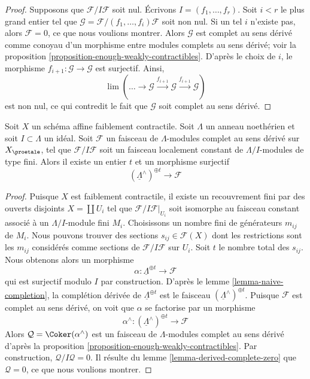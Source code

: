 \begin{proof}
Supposons que $\mathcal{F}/I\mathcal{F}$ soit nul.
Écrivons $I = (f_1, \ldots, f_r)$. Soit $i < r$ le plus grand
entier tel que $\mathcal{G} = \mathcal{F}/(f_1, \ldots, f_i)\mathcal{F}$
soit non nul. Si un tel $i$ n'existe pas, alors $\mathcal{F} = 0$, ce que nous
voulions montrer. Alors $\mathcal{G}$ est complet au sens dérivé comme conoyau
d'un morphisme entre modules complets au sens dérivé; voir la
proposition \ref{proposition-enough-weakly-contractibles}.
D'après le choix de $i$, le morphisme $f_{i + 1} : \mathcal{G} \to \mathcal{G}$
est surjectif. Ainsi,
$$
\lim (\ldots \to \mathcal{G} \xrightarrow{f_{i + 1}} \mathcal{G}
\xrightarrow{f_{i + 1}} \mathcal{G})
$$
est non nul, ce qui contredit le fait que $\mathcal{G}$ soit complet au sens dérivé.
\end{proof}

\begin{lemma}
\label{lemma-derived-complete-limit}
Soit $X$ un schéma affine faiblement contractile.
Soit $\Lambda$ un anneau noethérien et soit $I \subset \Lambda$ un idéal.
Soit $\mathcal{F}$ un faisceau de $\Lambda$-modules complet au sens dérivé
sur $X_\proetale$, tel que $\mathcal{F}/I\mathcal{F}$ soit un faisceau localement
constant de $\Lambda/I$-modules de type fini.
Alors il existe un entier $t$ et un morphisme surjectif
$$
(\underline{\Lambda}^\wedge)^{\oplus t} \to \mathcal{F}
$$
\end{lemma}

\begin{proof}
Puisque $X$ est faiblement contractile, il existe un recouvrement fini par des ouverts disjoints
$X = \coprod U_i$ tel que $\mathcal{F}/I\mathcal{F}|_{U_i}$
soit isomorphe au faisceau constant associé à un $\Lambda/I$-module fini
$M_i$. Choisissons un nombre fini de générateurs $m_{ij}$ de $M_i$. Nous
pouvons trouver des sections $s_{ij} \in \mathcal{F}(X)$ dont les restrictions sont les
$m_{ij}$ considérés comme sections de $\mathcal{F}/I\mathcal{F}$ sur $U_i$. 
Soit $t$ le nombre total des $s_{ij}$. Nous obtenons alors un morphisme
$$
\alpha : \underline{\Lambda}^{\oplus t} \longrightarrow \mathcal{F}
$$
qui est surjectif modulo $I$ par construction. D'après le
lemme \ref{lemma-naive-completion},
la complétion dérivée de $\underline{\Lambda}^{\oplus t}$ est le
faisceau $(\underline{\Lambda}^\wedge)^{\oplus t}$. Puisque $\mathcal{F}$
est complet au sens dérivé, on voit que $\alpha$ se factorise par un morphisme
$$
\alpha^\wedge :
(\underline{\Lambda}^\wedge)^{\oplus t}
\longrightarrow
\mathcal{F}
$$
Alors $\mathcal{Q} = \Coker(\alpha^\wedge)$ est un faisceau de
$\Lambda$-modules complet au sens dérivé d'après la
proposition \ref{proposition-enough-weakly-contractibles}.
Par construction, $\mathcal{Q}/I\mathcal{Q} = 0$. Il résulte du
lemme \ref{lemma-derived-complete-zero}
que $\mathcal{Q} = 0$, ce que nous voulions montrer.
\end{proof}








